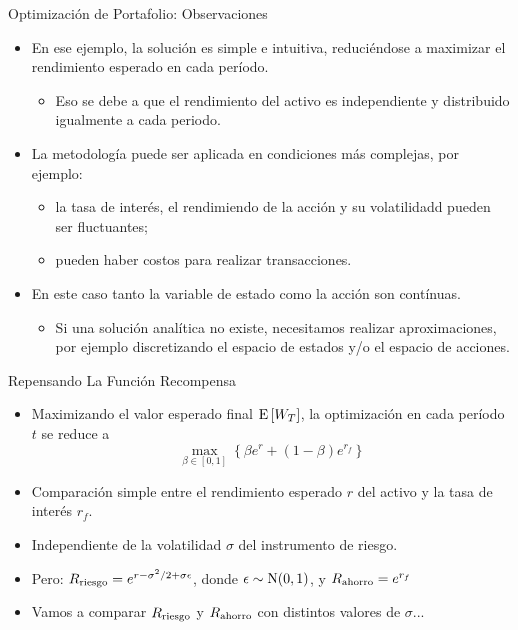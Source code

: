 \documentclass[handout]{beamer}
\begin{document}
\begin{frame}{Optimización de Portafolio: Observaciones}
\begin{itemize}
\item En ese ejemplo, la solución es simple e intuitiva, reduciéndose a maximizar el rendimiento esperado en cada período. 
\begin{itemize}
\item<2-> Eso se debe a que el rendimiento del activo es independiente y distribuido igualmente a cada periodo.
\end{itemize}
\item<3-> La metodología puede ser aplicada en condiciones más complejas, por ejemplo:
\begin{itemize} 
\item<4-> la tasa de interés, el rendimiendo de la acción y su volatilidadd pueden ser fluctuantes;
\item<5-> pueden haber costos para realizar transacciones.
\end{itemize}
\item<6-> En este caso tanto la variable de estado como la acción son contínuas.
\begin{itemize}
\item<7-> Si una solución analítica no existe, necesitamos realizar aproximaciones, por ejemplo discretizando el espacio de estados y/o el espacio de acciones.
\end{itemize}
\end{itemize}
\end{frame}

\begin{frame}{Repensando La Función Recompensa}
\begin{itemize}
\item Maximizando el valor esperado final ${\rm E}\left[W_T\right]$, la optimización en cada período $t$ se reduce a
$$
\max\limits_{\beta \in [0,1]} \left\{\beta e^r + (1-\beta)e^{r_f}\right\} 
$$
\item<2-> Comparación simple entre el rendimiento esperado $r$ del activo y la tasa de interés $r_f$.
\item<3-> Independiente de la volatilidad $\sigma$ del instrumento de riesgo.
\item<4-> Pero: $R_{\rm riesgo} = e^{r-\sigma^2/2+\sigma \epsilon}$, donde $\epsilon \sim {\rm N}(0,1)$, y $R_{\rm ahorro} = e^{r_f}$
\item<5-> Vamos a comparar $R_{\rm riesgo}$ y $R_{\rm ahorro}$ con distintos valores de $\sigma$...
\end{itemize}
\end{frame}
\end{document}

